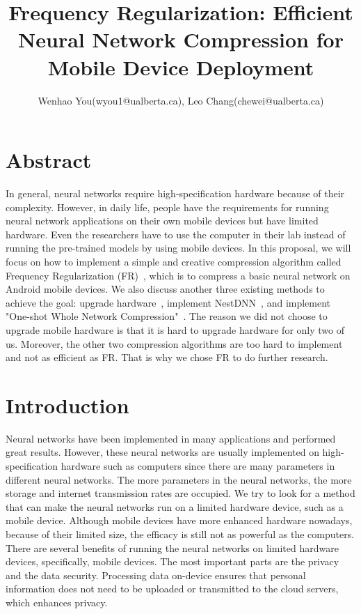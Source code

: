 \documentclass{article}
\title{Frequency Regularization: Efficient Neural Network Compression for Mobile Device Deployment}
\author{Wenhao You(wyou1@ualberta.ca), Leo Chang(chewei@ualberta.ca)}
\date{}
\begin{document}
	\maketitle
	
	\section*{Abstract}

In general, neural networks require high-specification hardware because of their complexity. However, in daily life, people have the requirements for running neural network applications on their own mobile devices but have limited hardware. Even the researchers have to use the computer in their lab instead of running the pre-trained models by using mobile devices. In this proposal, we will focus on how to implement a simple and creative compression algorithm called Frequency Regularization (FR)~\cite{zhao2023frequency}, which is to compress a basic neural network on Android mobile devices. We also discuss another three existing methods to achieve the goal: upgrade hardware~\cite{akusok2019metal}, implement NestDNN~\cite{fang2018nestdnn}, and implement "One-shot Whole Network Compression"~\cite{kim2016compression}. The reason we did not choose to upgrade mobile hardware is that it is hard to upgrade hardware for only two of us. Moreover, the other two compression algorithms are too hard to implement and not as efficient as FR. That is why we chose FR to do further research.



	\section*{Introduction}
	
Neural networks have been implemented in many applications and performed great results. However, these neural networks are usually implemented on high-specification hardware such as computers since there are many parameters in different neural networks. The more parameters in the neural networks, the more storage and internet transmission rates are occupied. We try to look for a method that can make the neural networks run on a limited hardware device, such as a mobile device. Although mobile devices have more enhanced hardware nowadays, because of their limited size, the efficacy is still not as powerful as the computers. There are several benefits of running the neural networks on limited hardware devices, specifically, mobile devices. The most important parts are the privacy and the data security. Processing data on-device ensures that personal information does not need to be uploaded or transmitted to the cloud servers, which enhances privacy. 
\end{document}
